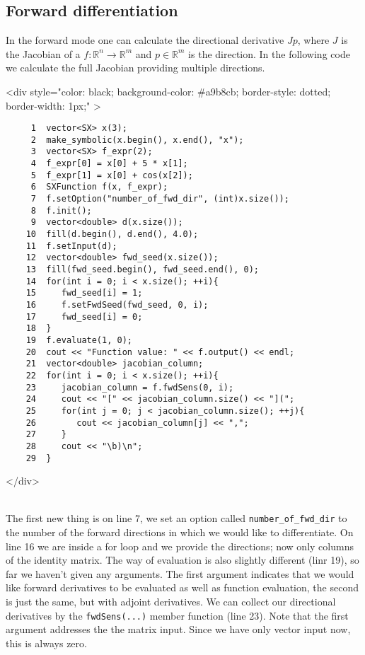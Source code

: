 \documentclass[a4paper,12pt]{book}
\newcommand{\codebegin}{
\begin{rawhtml}
<div style="color: black; background-color: \#a9b8cb;  border-style: dotted; border-width: 1px;" >
\end{rawhtml}
}
\newcommand{\codeend}{
\begin{rawhtml}
</div>
\end{rawhtml}
}
\begin{document}
{\subsection*{Forward differentiation}
 In the forward mode one can calculate the directional derivative
$J p$, where $J$ is the Jacobian of a $f: \mathbb{R}^n \rightarrow \mathbb{R}^m$ and $p \in \mathbb{R}^m$ is the direction.
In the following code we calculate the full Jacobian providing multiple directions.
\par
\codebegin
\begin{verbatim}
     1  vector<SX> x(3);
     2  make_symbolic(x.begin(), x.end(), "x");
     3  vector<SX> f_expr(2);
     4  f_expr[0] = x[0] + 5 * x[1];
     5  f_expr[1] = x[0] + cos(x[2]);
     6  SXFunction f(x, f_expr);
     7  f.setOption("number_of_fwd_dir", (int)x.size());
     8  f.init();
     9  vector<double> d(x.size());
    10  fill(d.begin(), d.end(), 4.0);
    11  f.setInput(d);
    12  vector<double> fwd_seed(x.size());
    13  fill(fwd_seed.begin(), fwd_seed.end(), 0);
    14  for(int i = 0; i < x.size(); ++i){
    15     fwd_seed[i] = 1;
    16     f.setFwdSeed(fwd_seed, 0, i);
    17     fwd_seed[i] = 0;
    18  }
    19  f.evaluate(1, 0);
    20  cout << "Function value: " << f.output() << endl;
    21  vector<double> jacobian_column;
    22  for(int i = 0; i < x.size(); ++i){
    23     jacobian_column = f.fwdSens(0, i);
    24     cout << "[" << jacobian_column.size() << "](";
    25     for(int j = 0; j < jacobian_column.size(); ++j){
    26        cout << jacobian_column[j] << ",";
    27     }
    28     cout << "\b)\n";
    29  }
\end{verbatim}
\codeend\\
The first new thing is on line 7, we set an option called \texttt{number\_of\_fwd\_dir} to the number
of the forward directions in which we would like to differentiate. On line 16 we are inside a for loop
and we provide the directions; now only columns of the identity matrix. The way of evaluation is also
slightly different (linr 19), so far we haven't given any arguments. The first argument indicates that we would like
forward derivatives to be evaluated as well as function evaluation, the second is just the same,
 but with adjoint derivatives. We can collect our
directional derivatives by the \texttt{fwdSens(...)} member function (line 23). Note that the first argument addresses
the the matrix input. Since we have only vector input now, this is always zero.
}
\end{document}

